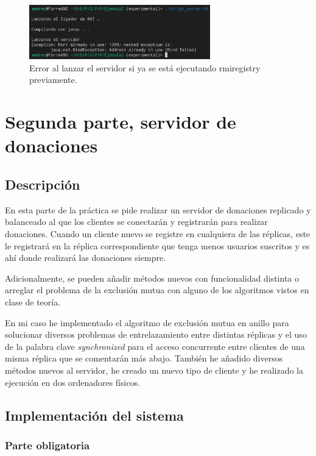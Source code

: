 \documentclass{article}
\begin{document}
\begin{figure}[H]
    \centering
    \includegraphics[width=0.7\textwidth]{imagenes/E3Error.png}
    \caption{Error al lanzar el servidor si ya se está ejecutando rmiregistry previamente.}
\end{figure}

\newpage

\section{Segunda parte, servidor de donaciones}
\subsection{Descripción}
En esta parte de la práctica se pide realizar un servidor de donaciones replicado y balanceado al que los clientes se conectarán y registrarán para realizar donaciones. Cuando un cliente nuevo se registre en cualquiera de las réplicas, este le registrará en la réplica correspondiente que tenga menos usuarios suscritos y es ahí donde realizará las donaciones siempre.

Adicionalmente, se pueden añadir métodos nuevos con funcionalidad distinta o arreglar el problema de la exclusión mutua con alguno de los algoritmos vistos en clase de teoría.

\bigskip

En mi caso he implementado el algoritmo de exclusión mutua en anillo para solucionar diversos problemas de entrelazamiento entre distintas réplicas y el uso de la palabra clave \textit{synchronized} para el acceso concurrente entre clientes de una misma réplica que se comentarán más abajo. También he añadido diversos métodos nuevos al servidor, he creado un nuevo tipo de cliente y he realizado la ejecución en dos ordenadores físicos.

\subsection{Implementación del sistema}
\subsubsection{Parte obligatoria}
\end{document}
